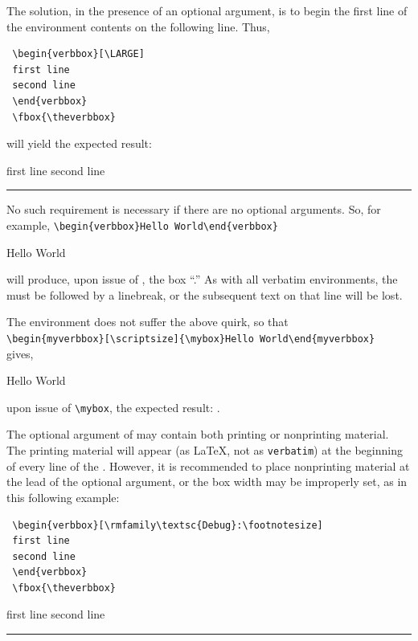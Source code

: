 \documentclass{article}
\newcommand\rl{\rule{1em}{0in}}
\begin{document}
\begin{myverbbox}{\myvb}
The solution, in the presence of an optional argument, is to begin the
first line of the environment contents on the following line.  Thus,

\begin{verbatim}
 \begin{verbbox}[\LARGE]
 first line
 second line
 \end{verbbox}
 \fbox{\theverbbox}
\end{verbatim}

will yield the expected result:\\
\begin{verbbox}[\LARGE]
first line
second line
\end{verbbox}
\rl\addvbuffer[3pt 0pt]{\fbox{\theverbbox}}

No such requirement is necessary if there are no optional arguments.
So, for example,
\verb|\begin{verbbox}Hello World\end{verbbox}|
\begin{verbbox}Hello World\end{verbbox} 
will produce, upon issue of \tvb, the box ``\theverbbox.''  As with all
verbatim environments, the {\evbenv} must be followed by a linebreak, or
the subsequent text on that line will be lost.

The {\myvrbox} environment does not suffer the above quirk, so that\\
\verb|\begin{myverbbox}[\scriptsize]{\mybox}Hello World\end{myverbbox}|\\
gives, \begin{myverbbox}[\scriptsize]{\mybox}Hello World\end{myverbbox}
upon issue of \verb|\mybox|, the expected result: \mybox.

The optional argument of {\vrbox} may contain both printing or
nonprinting material.  The printing material will appear (as \LaTeX{},
not as \verb|verbatim|) at the beginning of every line of the \vrbox.
However, it is recommended to place nonprinting material at the lead of
the optional argument, or the box width may be improperly set, as in
this following example:

\begin{verbatim}
 \begin{verbbox}[\rmfamily\textsc{Debug}:\footnotesize]
 first line
 second line
 \end{verbbox}
 \fbox{\theverbbox}
\end{verbatim}
\begin{verbbox}
first line
second line
\end{verbbox}
\rl\fbox{\theverbbox}


\end{myverbbox}
\end{document}
